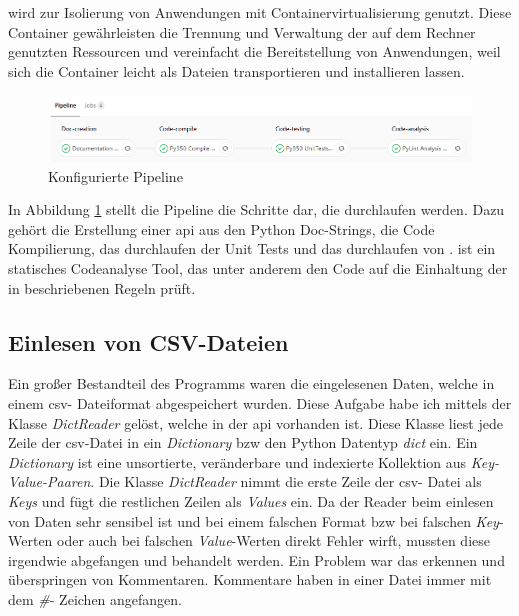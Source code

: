  wird zur Isolierung von Anwendungen mit Containervirtualisierung 
genutzt. Diese Container gewährleisten die Trennung und Verwaltung der auf dem Rechner 
genutzten Ressourcen und vereinfacht die Bereitstellung von Anwendungen, weil sich die 
Container leicht als Dateien transportieren und installieren lassen.

\begin{figure}[H]
	\centering
	\includegraphics[width=1\textwidth, height=0.2\textwidth]{graphics/pipeline.png}
	\caption{Konfigurierte Pipeline}
	\label{fig:pipeline}
\end{figure}

In Abbildung \ref{fig:pipeline} stellt die Pipeline die Schritte dar, die durchlaufen werden.
Dazu gehört die Erstellung einer \ac{api} aus den Python Doc-Strings, die Code Kompilierung, 
das durchlaufen der Unit Tests und das durchlaufen von . 
 ist ein statisches Codeanalyse Tool, das unter anderem den Code auf 
die Einhaltung der in  beschriebenen Regeln prüft.


\subsection{Einlesen von CSV-Dateien}
\label{subsec:read_csv}

Ein großer Bestandteil des Programms waren die eingelesenen Daten, welche in einem \ac{csv}-
Dateiformat abgespeichert wurden. Diese Aufgabe habe ich mittels der Klasse \textit{DictReader} 
gelöst, welche in der  \ac{api} vorhanden ist. Diese Klasse liest jede 
Zeile der \ac{csv}-Datei in ein \textit{Dictionary} \ac{bzw} den Python Datentyp \textit{dict} 
ein. Ein \textit{Dictionary} ist eine unsortierte, veränderbare und indexierte Kollektion aus 
\textit{Key-Value-Paaren}. Die Klasse \textit{DictReader} nimmt die erste Zeile der \ac{csv}-
Datei als \textit{Keys} und fügt die restlichen Zeilen als \textit{Values} ein. 
Da der Reader beim einlesen von Daten sehr sensibel ist und bei einem falschen Format \ac{bzw} 
bei falschen \textit{Key}-Werten oder auch bei falschen \textit{Value}-Werten direkt Fehler 
wirft, mussten diese irgendwie abgefangen und behandelt werden. Ein Problem war das erkennen 
und überspringen von Kommentaren. Kommentare haben in einer Datei immer mit dem \textit{\#}-
Zeichen angefangen. 
\pagebreak

